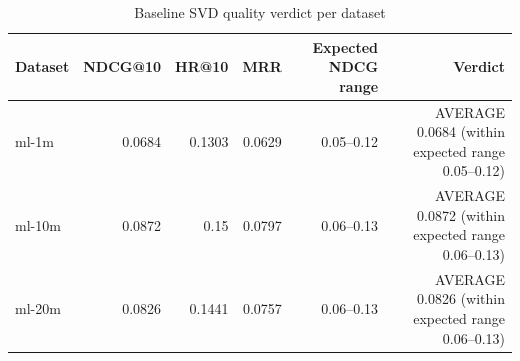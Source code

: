 \begin{table}[ht]
\centering
\caption{Baseline SVD quality verdict per dataset}
\begin{tabular}{lrrrrr}
\toprule
Dataset & NDCG@10 & HR@10 & MRR & Expected NDCG range & Verdict \\
\midrule
ml-1m & 0.0684 & 0.1303 & 0.0629 & 0.05–0.12 & AVERAGE     0.0684  (within expected range 0.05–0.12) \\
ml-10m & 0.0872 & 0.15 & 0.0797 & 0.06–0.13 & AVERAGE     0.0872  (within expected range 0.06–0.13) \\
ml-20m & 0.0826 & 0.1441 & 0.0757 & 0.06–0.13 & AVERAGE     0.0826  (within expected range 0.06–0.13) \\
\bottomrule
\end{tabular}
\end{table}